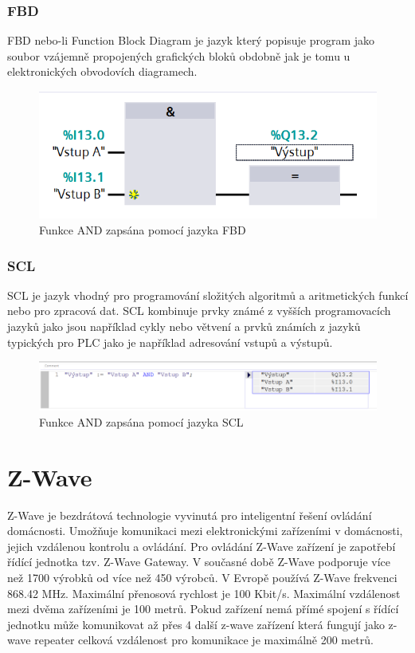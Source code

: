 \documentclass[a4paper,12pt,czech,bibliography=totoc]{scrbook}
\begin{document}
\subsubsection{FBD}
 FBD nebo-li Function Block Diagram je jazyk který popisuje program jako soubor vzájemně propojených grafických bloků obdobně jak je tomu u elektronických obvodovích diagramech. 
    	\begin{figure}[h]
    	\centering
    	\includegraphics[scale = 0.6]{FBD_AND.PNG}
    	\caption{Funkce AND zapsána pomocí jazyka FBD}
    	\label{fig:my_label}
    \end{figure}
\subsubsection{SCL}
SCL je jazyk vhodný pro programování složitých algoritmů a aritmetických funkcí nebo pro zpracová dat. SCL kombinuje prvky známé z vyšších programovacích jazyků jako jsou například cykly nebo větvení a prvků známích z jazyků typických pro PLC jako je například adresování vstupů a výstupů.
	\begin{figure}[h]
	\centering
	\includegraphics[scale = 0.5]{SCL_AND.PNG}
	\caption{Funkce AND zapsána pomocí jazyka SCL}
	\label{fig:my_label}
\end{figure}

\section{Z-Wave}
Z-Wave je bezdrátová technologie vyvinutá pro inteligentní řešení ovládání domácnosti. Umožňuje komunikaci mezi elektronickými zařízeními v domácnosti, jejich vzdálenou kontrolu a ovládání. Pro ovládání Z-Wave zařízení je zapotřebí řídící jednotka tzv. Z-Wave Gateway. V současné době Z-Wave podporuje více než 1700 výrobků od více než 450 výrobců. V Evropě používá Z-Wave frekvenci 868.42 MHz. Maximální přenosová rychlost je 100 Kbit/s. Maximální vzdálenost mezi dvěma zařízeními je 100 metrů. Pokud zařízení nemá přímé spojení s řídící jednotku může komunikovat až přes 4 další z-wave zařízení která fungují jako z-wave repeater celková vzdálenost pro komunikace je maximálně 200 metrů.
\end{document}
